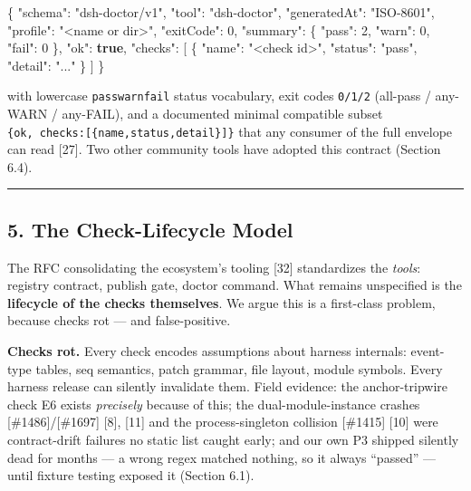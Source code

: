 \documentclass[
]{article}
\newenvironment{Shaded}{}{}
\newcommand{\DataTypeTok}[1]{\textcolor[rgb]{0.56,0.13,0.00}{#1}}
\newcommand{\DecValTok}[1]{\textcolor[rgb]{0.25,0.63,0.44}{#1}}
\newcommand{\FunctionTok}[1]{\textcolor[rgb]{0.02,0.16,0.49}{#1}}
\newcommand{\KeywordTok}[1]{\textcolor[rgb]{0.00,0.44,0.13}{\textbf{#1}}}
\newcommand{\OtherTok}[1]{\textcolor[rgb]{0.00,0.44,0.13}{#1}}
\newcommand{\StringTok}[1]{\textcolor[rgb]{0.25,0.44,0.63}{#1}}
\begin{document}
\begin{Shaded}
\begin{Highlighting}[]
\FunctionTok{\{}
  \DataTypeTok{"schema"}\FunctionTok{:} \StringTok{"dsh{-}doctor/v1"}\FunctionTok{,}
  \DataTypeTok{"tool"}\FunctionTok{:} \StringTok{"dsh{-}doctor"}\FunctionTok{,}
  \DataTypeTok{"generatedAt"}\FunctionTok{:} \StringTok{"ISO{-}8601"}\FunctionTok{,}
  \DataTypeTok{"profile"}\FunctionTok{:} \StringTok{"\textless{}name or dir\textgreater{}"}\FunctionTok{,}
  \DataTypeTok{"exitCode"}\FunctionTok{:} \DecValTok{0}\FunctionTok{,}
  \DataTypeTok{"summary"}\FunctionTok{:} \FunctionTok{\{} \DataTypeTok{"pass"}\FunctionTok{:} \DecValTok{2}\FunctionTok{,} \DataTypeTok{"warn"}\FunctionTok{:} \DecValTok{0}\FunctionTok{,} \DataTypeTok{"fail"}\FunctionTok{:} \DecValTok{0} \FunctionTok{\},}
  \DataTypeTok{"ok"}\FunctionTok{:} \KeywordTok{true}\FunctionTok{,}
  \DataTypeTok{"checks"}\FunctionTok{:} \OtherTok{[} \FunctionTok{\{} \DataTypeTok{"name"}\FunctionTok{:} \StringTok{"\textless{}check id\textgreater{}"}\FunctionTok{,} \DataTypeTok{"status"}\FunctionTok{:} \StringTok{"pass"}\FunctionTok{,} \DataTypeTok{"detail"}\FunctionTok{:} \StringTok{"..."} \FunctionTok{\}} \OtherTok{]}
\FunctionTok{\}}
\end{Highlighting}
\end{Shaded}

with lowercase \texttt{pass\textbar{}warn\textbar{}fail} status
vocabulary, exit codes \texttt{0/1/2} (all-pass / any-WARN / any-FAIL),
and a documented minimal compatible subset
\texttt{\{ok,\ checks:{[}\{name,status,detail\}{]}\}} that any consumer
of the full envelope can read {[}27{]}. Two other community tools have
adopted this contract (Section 6.4).

\begin{center}\rule{0.5\linewidth}{0.5pt}\end{center}

\subsection{5. The Check-Lifecycle
Model}\label{the-check-lifecycle-model}

The RFC consolidating the ecosystem's tooling {[}32{]} standardizes the
\emph{tools}: registry contract, publish gate, doctor command. What
remains unspecified is the \textbf{lifecycle of the checks themselves}.
We argue this is a first-class problem, because checks rot --- and
false-positive.

\textbf{Checks rot.} Every check encodes assumptions about harness
internals: event-type tables, seq semantics, patch grammar, file layout,
module symbols. Every harness release can silently invalidate them.
Field evidence: the anchor-tripwire check E6 exists \emph{precisely}
because of this; the dual-module-instance crashes
{[}\#1486{]}/{[}\#1697{]} {[}8{]}, {[}11{]} and the process-singleton
collision {[}\#1415{]} {[}10{]} were contract-drift failures no static
list caught early; and our own P3 shipped silently dead for months --- a
wrong regex matched nothing, so it always ``passed'' --- until fixture
testing exposed it (Section 6.1).
\end{document}
